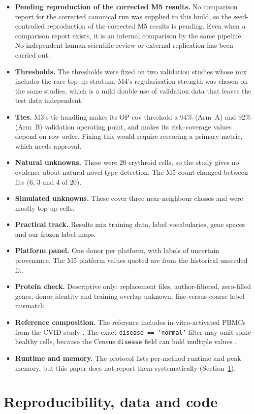 \documentclass[11pt]{article}
\newif\ifctreport
\newcommand{\Reprostatus}{\ifctreport A seed-controlled reproduction of the corrected M5 results was run and compared with the corrected canonical run by the repository's tiered comparison; that internal comparison reports overall status ``\ctres{comparison}{report}{overall}''. This is an internal tolerance comparison by the same pipeline, not independent verification\else No comparison report for the corrected canonical run was supplied to this build, so the seed-controlled reproduction of the corrected M5 results is pending\fi}
\begin{document}
\begin{itemize}
\item \textbf{Pending reproduction of the corrected M5 results.} \Reprostatus. Even when a comparison report exists, it is an internal comparison by the same pipeline. No independent human scientific review or external replication has been carried out.
\item \textbf{Thresholds.} The thresholds were fixed on two validation studies whose mix includes the rare top-up stratum. M4's regularisation strength was chosen on the same studies, which is a mild double use of validation data that leaves the test data independent.
\item \textbf{Ties.} M3's tie handling makes its OP-cov threshold a 94\% (Arm~A) and 92\% (Arm~B) validation operating point, and makes its risk--coverage values depend on row order. Fixing this would require rescoring a primary metric, which needs approval.
\item \textbf{Natural unknowns.} These were 20 erythroid cells, so the study gives no evidence about natural novel-type detection. The M5 count changed between fits (6, 3 and 4 of 20).
\item \textbf{Simulated unknowns.} These cover three near-neighbour classes and were mostly top-up cells.
\item \textbf{Practical track.} Results mix training data, label vocabularies, gene spaces and our frozen label maps.
\item \textbf{Platform panel.} One donor per platform, with labels of uncertain provenance. The M5 platform values quoted are from the historical unseeded fit.
\item \textbf{Protein check.} Descriptive only: replacement files, author-filtered, zero-filled genes, donor identity and training overlap unknown, fine-versus-coarse label mismatch.
\item \textbf{Reference composition.} The reference includes in-vitro-activated PBMCs from the CVID study \citep{rodriguezubreva2022cvid}. The exact \texttt{disease == 'normal'} filter may omit some healthy cells, because the Census \texttt{disease} field can hold multiple values \citep{censusreleases}.
\item \textbf{Runtime and memory.} The protocol lists per-method runtime and peak memory, but this paper does not report them systematically (Section~\ref{sec:repro}).
\end{itemize}

\section{Reproducibility, data and code}\label{sec:repro}
\end{document}
